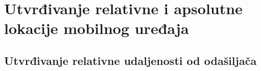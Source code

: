 \chapter{Utvrđivanje relativne i apsolutne lokacije mobilnog uređaja}

\section*{Utvrđivanje relativne udaljenosti od odašiljača}


